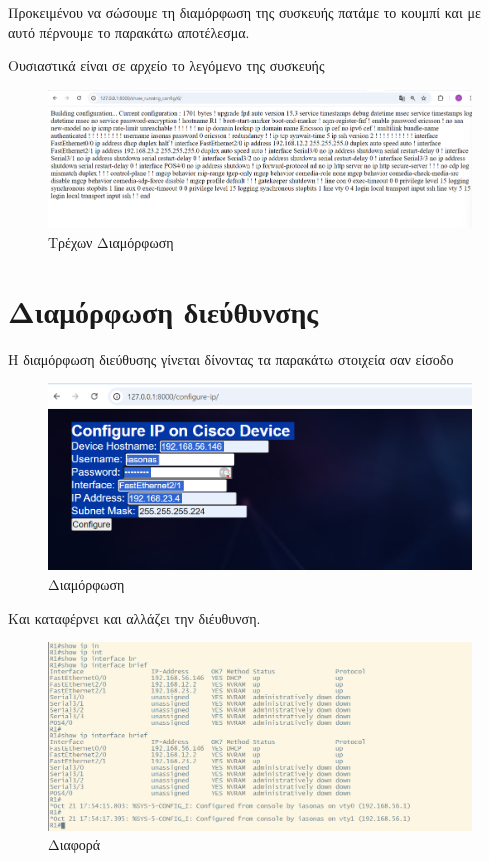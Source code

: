 Προκειμένου να σώσουμε τη διαμόρφωση της συσκευής πατάμε το κουμπί
 και με αυτό πέρνουμε το παρακάτω αποτέλεσμα.

Ουσιαστικά είναι σε  αρχείο το λεγόμενο 
της συσκευής

\FloatBarrier

\begin{figure}[h]
	\centering
	\includegraphics[width=1.0\textwidth]{graphics/running_config.png}
	\caption{Τρέχων Διαμόρφωση}
\end{figure}


\section{Διαμόρφωση διεύθυνσης }

Η διαμόρφωση  διεύθυσης γίνεται δίνοντας τα παρακάτω στοιχεία
σαν είσοδο

\FloatBarrier

\begin{figure}[h]
	\centering
	\includegraphics[width=1.0\textwidth]{graphics/configure_ip.png}
	\caption{Διαμόρφωση}
\end{figure}

Και καταφέρνει και αλλάζει την διέυθυνση.

\FloatBarrier

\begin{figure}[h]
	\centering
	\includegraphics[width=1.0\textwidth]{graphics/configure_ip_1.png}
	\caption{ Διαφορά}
\end{figure}